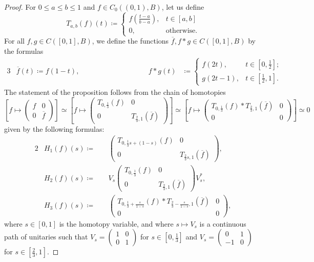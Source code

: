 \documentclass[10pt]{simplearticle}
\begin{document}
\begin{proof}
For $0\leq a\leq b\leq1$ and $f\in C_{0}((0,1),B)$,
let us define
\[
T_{a,b}(f)(t)\coloneqq\begin{cases}
f\left(\frac{t-a}{b-a}\right), & t\in[a,b]\\
0, & \textrm{otherwise}.
\end{cases}
\]
For all $f,g\in C([0,1],B)$, we define the functions $\overline{f},f*g\in C([0,1],B)$
by the formulas
\begin{alignat*}{3}
 & \overline{f}(t)\coloneqq f(1-t), & \qquad\qquad\qquad\qquad & f*g(t) & \coloneqq\begin{cases}
f(2t), & t\in\left[0,\frac{1}{2}\right];\\
g(2t-1), & t\in\left[\frac{1}{2},1\right].
\end{cases}
\end{alignat*}
The statement of the proposition follows from the chain of homotopies
\[
\left[f\mapsto\left(\begin{array}{cc}
f & 0\\
0 & \overline{f}
\end{array}\right)\right]\simeq\left[f\mapsto\left(\begin{array}{cc}
T_{0,\frac{1}{3}}(f) & 0\\
0 & T_{\frac{2}{3},1}(\overline{f})
\end{array}\right)\right]\simeq\left[f\mapsto\left(\begin{array}{cc}
T_{0,\frac{1}{3}}(f)*T_{\frac{2}{3},1}(\overline{f}) & 0\\
0 & 0
\end{array}\right)\right]\simeq0
\]
given by the following formulas:
\begin{alignat*}{2}
 & H_{1}(f)(s)\coloneqq &\ 
& \left(\begin{array}{cc}
T_{0,\frac{1}{3}s+(1-s)}(f) & 0\\
0 & T_{\frac{2}{3}s,1}(\overline{f})
\end{array}\right),\\
 & H_{2}(f)(s)\coloneqq &\ 
& V_{s}\left(\begin{array}{cc}
T_{0,\frac{1}{3}}(f) & 0\\
0 & T_{\frac{2}{3},1}(\overline{f})
\end{array}\right)V^{*}_{s},\\
 & H_{3}(f)(s)\coloneqq &\ 
& \left(\begin{array}{cc}
T_{0,\frac{1}{3}+\frac{s}{1-s}}(f)*T_{\frac{2}{3}-\frac{s}{1-s},1}(\overline{f}) & 0\\
0 & 0
\end{array}\right),
\end{alignat*}
where $s\in[0,1]$ is the homotopy variable, and where $s\mapsto V_{s}$
is a continuous path of unitaries such that $V_{s}=\left(\begin{array}{cc}
1 & 0\\
0 & 1
\end{array}\right)$ for $s\in\left[0,\frac{1}{3}\right]$ and $V_{s}=\left(\begin{array}{cc}
0 & 1\\
-1 & 0
\end{array}\right)$ for $s\in\left[\frac{2}{3},1\right]$.


\end{proof}
\end{document}
